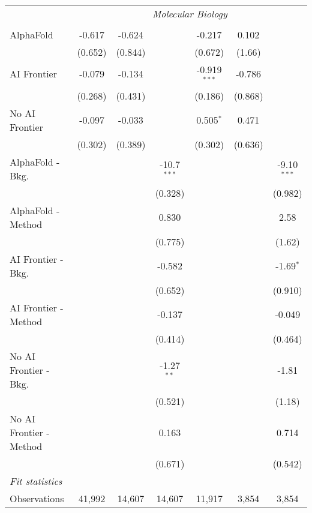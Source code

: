 \begin{tabular}{lcccccc}
 & \multicolumn{6}{c}{\textit{Molecular Biology}} \\ \\
   AlphaFold               & -0.617  & -0.624  &               & -0.217         & 0.102   &   \\   
                           & (0.652) & (0.844) &               & (0.672)        & (1.66)  &   \\   
   AI Frontier             & -0.079  & -0.134  &               & -0.919$^{***}$ & -0.786  &   \\   
                           & (0.268) & (0.431) &               & (0.186)        & (0.868) &   \\   
   No AI Frontier          & -0.097  & -0.033  &               & 0.505$^{*}$    & 0.471   &   \\   
                           & (0.302) & (0.389) &               & (0.302)        & (0.636) &   \\   
   AlphaFold - Bkg.        &         &         & -10.7$^{***}$ &                &         & -9.10$^{***}$\\   
                           &         &         & (0.328)       &                &         & (0.982)\\   
   AlphaFold - Method      &         &         & 0.830         &                &         & 2.58\\   
                           &         &         & (0.775)       &                &         & (1.62)\\   
   AI Frontier - Bkg.      &         &         & -0.582        &                &         & -1.69$^{*}$\\   
                           &         &         & (0.652)       &                &         & (0.910)\\   
   AI Frontier - Method    &         &         & -0.137        &                &         & -0.049\\   
                           &         &         & (0.414)       &                &         & (0.464)\\   
   No AI Frontier - Bkg.   &         &         & -1.27$^{**}$  &                &         & -1.81\\   
                           &         &         & (0.521)       &                &         & (1.18)\\   
   No AI Frontier - Method &         &         & 0.163         &                &         & 0.714\\   
                           &         &         & (0.671)       &                &         & (0.542)\\   
   \midrule
   \emph{Fit statistics}\\
   Observations            & 41,992  & 14,607  & 14,607        & 11,917         & 3,854   & 3,854\\  
   

\end{tabular}
